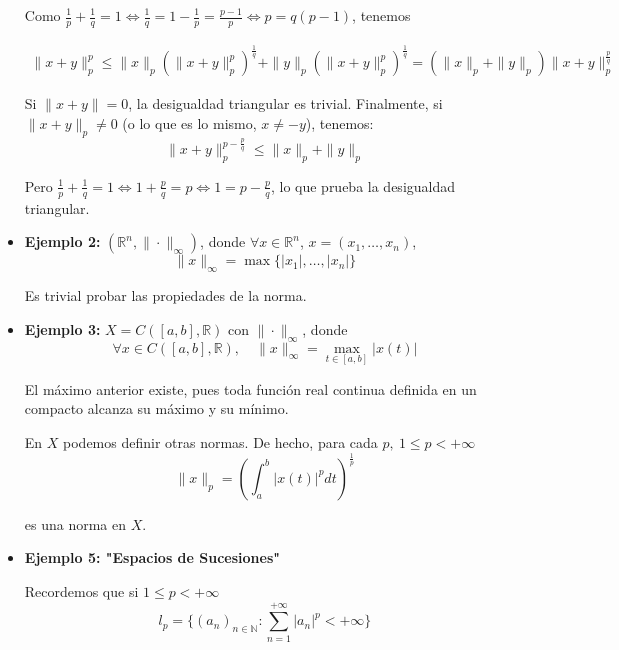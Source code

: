 \documentclass{article}
\begin{document}
\begin{itemize}
Como $\frac{1}{p}+\frac{1}{q}=1\Leftrightarrow \frac{1}{q}=1-\frac{1}{p}=\frac{p-1}{p}\Leftrightarrow p=q(p-1)$, tenemos

\begin{gather*}
\|x+y\|^p_p\leq \|x\|_p(\|x+y\|^p_p)^\frac{1}{q}+\|y\|_p(\|x+y\|_p^p)^\frac{1}{q}=(\|x\|_p+\|y\|_p)\|x+y\|_p^\frac{p}{q}
\end{gather*} 

Si $\|x+y\|=0$, la desigualdad triangular es trivial. Finalmente, si $\|x+y\|_p\neq 0$ (o lo que es lo mismo, $x\neq-y$), tenemos:
\begin{equation*}
\|x+y\|_p^{p-\frac{p}{q}}\leq \|x\|_p+\|y\|_p
\end{equation*}

Pero $\frac{1}{p}+\frac{1}{q}=1\Leftrightarrow 1+\frac{p}{q}=p\Leftrightarrow 1=p-\frac{p}{q}$, lo que prueba la desigualdad triangular.

\item \textbf{Ejemplo 2:} $(\mathbb{R}^n,\|\cdot\|_\infty)$, donde $\forall x\in \mathbb{R}^n$, $x=(x_1,\ldots,x_n)$,
\begin{equation*}
\|x\|_\infty=\max\{|x_1|,\ldots,|x_n|\}
\end{equation*}

Es trivial probar las propiedades de la norma.

\item \textbf{Ejemplo 3:} $X=C([a,b],\mathbb{R})$ con $\|\cdot\|_\infty$, donde 
\begin{equation*}
\forall x\in C([a,b],\mathbb{R}),\quad \|x\|_\infty =\max_{t\in[a,b]}|x(t)|
\end{equation*}

El máximo anterior existe, pues toda función real continua definida en un compacto alcanza su máximo y su mínimo.

En $X$ podemos definir otras normas. De hecho, para cada $p,\:1\leq p<+\infty$
\begin{equation*}
\|x\|_p=\left(\int_a^b|x(t)|^p dt\right)^\frac{1}{p}
\end{equation*}

es una norma en $X$.

\item \textbf{Ejemplo 5: "Espacios de Sucesiones"}

Recordemos que si $1\leq p <+\infty$
\begin{equation*}
l_p=\{(a_n)_{n\in\mathbb{N}}:\sum_{n=1}^{+\infty}|a_n|^p<+\infty\}
\end{equation*}


\end{itemize}
\end{document}

